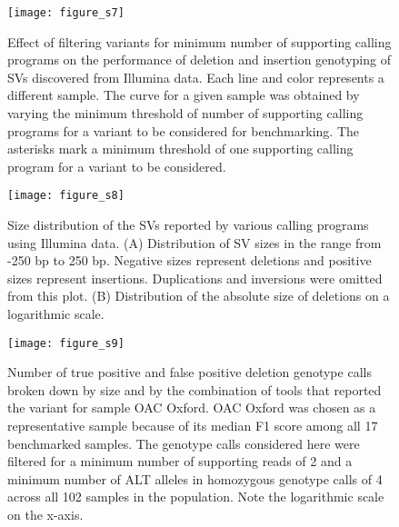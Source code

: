 \documentclass[12pt]{article}
\newenvironment{cfigure}
	{\begin{figure} \centering}
	{\end{figure}}
\newenvironment{lsfigure}
	{\begin{landscape} \begin{figure} \centering}
	{\end{figure} \end{landscape}}
\begin{document}
\begin{cfigure}
	\texttt{[image: figure\_s7]}

	\caption[Effect of the number of supporting calling programs on genotyping performance of Illumina deletions and insertions]{
		Effect of filtering variants for minimum number of supporting calling programs on the performance of deletion and insertion genotyping of SVs discovered from Illumina data.
		Each line and color represents a different sample.
		The curve for a given sample was obtained by varying the minimum threshold of number of supporting calling programs for a variant to be considered for benchmarking.
		The asterisks mark a minimum threshold of one supporting calling program for a variant to be considered.
		}

	\label{fig_s7}

\end{cfigure}

\clearpage%

\begin{cfigure}
	\texttt{[image: figure\_s8]}

	\caption[Size distribution of the SVs reported by various calling programs using Illumina data]{
		Size distribution of the SVs reported by various calling programs using Illumina data.
		(A) Distribution of SV sizes in the range from -250 bp to 250 bp.
		Negative sizes represent deletions and positive sizes represent insertions.
		Duplications and inversions were omitted from this plot.
		(B) Distribution of the absolute size of deletions on a logarithmic scale.
	}

	\label{fig_s8}

\end{cfigure}

\clearpage%

\begin{lsfigure}
	\texttt{[image: figure\_s9]}

	\caption[Number of true positive and false positive deletion calls reported by various calling program combinations]{
		Number of true positive and false positive deletion genotype calls broken down by size and by the combination of tools that reported the variant for sample OAC Oxford.
		OAC Oxford was chosen as a representative sample because of its median F1 score among all 17 benchmarked samples.
		The genotype calls considered here were filtered for a minimum number of supporting reads of 2 and a minimum number of ALT alleles in homozygous genotype calls of 4 across all 102 samples in the population.
		Note the logarithmic scale on the x-axis.
	}

	\label{fig_s9}

\end{lsfigure}
\end{document}
